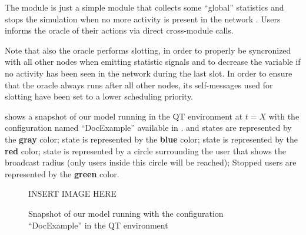 The  module is just a simple module that collects some ``global''
statistics and stops the simulation when no more activity is present in the
network . Users informs the oracle of
their actions via direct cross-module calls.

Note that also the oracle performs slotting, in order to properly be syncronized
with all other nodes when emitting statistic signals and to decrease the
 variable if no activity has been seen in the network during the
last slot. In order to ensure that the oracle always runs after all other nodes,
its self-messages used for slotting have been set to a lower scheduling
priority.

 shows a snapshot of our model running in the \omnetpp{} QT
environment at \(t = X\) with the configuration named ``DocExample'' available
in .  and  states are
represented by the \textcolor{idle}{\textbf{gray}} color;  state
is represented by the \textcolor{hearing}{\textbf{blue}} color; 
state is represented by the \textcolor{collision}{\textbf{red}} color;
 state is represented by a circle surrounding the user that shows
the broadcast radius (only users inside this circle will be reached); Stopped
users are represented by the \textcolor{relayed}{\textbf{green}} color.

\begin{figure}[htb]
	\centering
	INSERT IMAGE HERE
	\caption{Snapshot of our model running with the configuration
	``DocExample'' in the \omnetpp{} QT environment}\label{fig:snapshot}
\end{figure}
